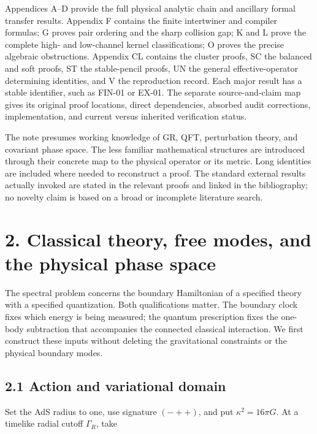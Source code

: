 Appendices A--D provide the full physical analytic chain and ancillary formal transfer results. Appendix F contains the finite intertwiner and compiler formulas; G proves pair ordering and the sharp collision gap; K and L prove the complete high- and low-channel kernel classifications; O proves the precise algebraic obstructions. Appendix CL contains the cluster proofs, SC the balanced and soft proofs, ST the stable-pencil proofs, UN the general effective-operator determining identities, and V the reproduction record. Each major result has a stable identifier, such as FIN-01 or EX-01. The separate source-and-claim map gives its original proof locations, direct dependencies, absorbed audit corrections, implementation, and current versus inherited verification status.

The note presumes working knowledge of GR, QFT, perturbation theory, and covariant phase space. The less familiar mathematical structures are introduced through their concrete map to the physical operator or its metric. Long identities are included where needed to reconstruct a proof. The standard external results actually invoked are stated in the relevant proofs and linked in the bibliography; no novelty claim is based on a broad or incomplete literature search.

\clearpage
\hypertarget{classical-theory-free-modes-and-the-physical-phase-space}{%
\section{2. Classical theory, free modes, and the physical phase space}\label{classical-theory-free-modes-and-the-physical-phase-space}}

The spectral problem concerns the boundary Hamiltonian of a specified theory with a specified quantization. Both qualifications matter. The boundary clock fixes which energy is being measured; the quantum prescription fixes the one-body subtraction that accompanies the connected classical interaction. We first construct these inputs without deleting the gravitational constraints or the physical boundary modes.

\hypertarget{action-and-variational-domain}{%
\subsection{2.1 Action and variational domain}\label{action-and-variational-domain}}

Set the AdS radius to one, use signature \((-++)\), and put \(\kappa^2=16\pi G\). At a timelike radial cutoff \(\Gamma_R\), take

